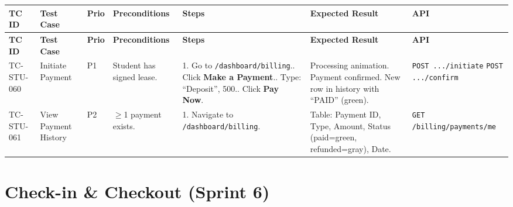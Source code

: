 \documentclass[12pt,a4paper]{article}
\begin{document}
\begin{longtable}{L{2cm} L{3cm} L{1cm} L{4cm} L{5.5cm} L{5.5cm} L{3cm}}
\toprule
\textbf{TC ID} & \textbf{Test Case} & \textbf{Prio} & \textbf{Preconditions} & \textbf{Steps} & \textbf{Expected Result} & \textbf{API} \\
\midrule
\endfirsthead
\toprule
\textbf{TC ID} & \textbf{Test Case} & \textbf{Prio} & \textbf{Preconditions} & \textbf{Steps} & \textbf{Expected Result} & \textbf{API} \\
\midrule
\endhead
\bottomrule
\endfoot

TC-STU-060
& Initiate Payment
& P1
& Student has signed lease.
& 1. Go to \texttt{/dashboard/billing}.. Click \textbf{Make a Payment}.. Type: ``Deposit'', 500.. Click \textbf{Pay Now}.
& Processing animation. Payment confirmed. New row in history with ``PAID'' (green).
& \texttt{POST .../initiate} \texttt{POST .../confirm}
\\
\midrule

TC-STU-061
& View Payment History
& P2
& $\geq$1 payment exists.
& 1. Navigate to \texttt{/dashboard/billing}.
& Table: Payment ID, Type, Amount, Status (paid=green, refunded=gray), Date.
& \texttt{GET /billing/payments/me}
\\

\end{longtable}


\section{Check-in \& Checkout (Sprint 6)}
\end{document}
